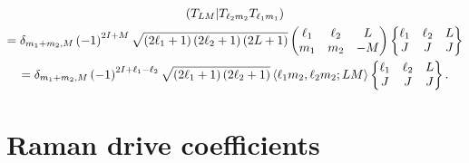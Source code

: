 \documentclass[nofootinbib,notitlepage,11pt]{revtex4-2}
\newcommand{\p}[1]{\left(#1\right)} %
\newcommand{\bk}{\Braket} %
\newcommand{\1}{\mathds{1}}
\def\obk#1{\mathinner{({#1})}}
\begin{document}
\begin{multline}
  \obk{T_{LM} | T_{\ell_2 m_2} T_{\ell_1 m_1}} \\
  = \delta_{m_1+m_2,M} \p{-1}^{2I+M}
  \sqrt{\p{2\ell_1+1}\p{2\ell_2+1}\p{2L+1}}
  \begin{pmatrix}
    \ell_1 & \ell_2 & L \\
    m_1 & m_2 & -M
  \end{pmatrix}
  \begin{Bmatrix}
    \ell_1 & \ell_2 & L \\
    J & J & J
  \end{Bmatrix} \\
  = \delta_{m_1+m_2,M} \p{-1}^{2I+\ell_1-\ell_2}
  \sqrt{\p{2\ell_1+1}\p{2\ell_2+1}}
  \bk{\ell_1 m_2, \ell_2 m_2; LM}
  \begin{Bmatrix}
    \ell_1 & \ell_2 & L \\
    J & J & J
  \end{Bmatrix}.
\end{multline}

\section{Raman drive coefficients}
\label{sec:raman_coeff}
\end{document}
